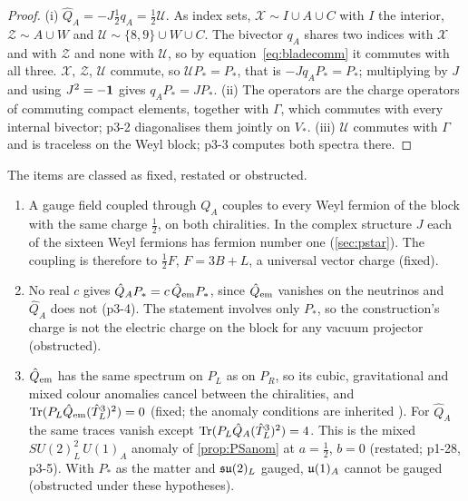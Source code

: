\begin{proof}
(i) $\hat Q_A=-J\tfrac12q_A=\tfrac12\mathcal U$. As index sets, $\mathcal X\sim I\cup A\cup C$ with $I$ the interior, $\mathcal Z\sim A\cup W$ and $\mathcal U\sim\{8,9\}\cup W\cup C$. The bivector $q_A$ shares two
indices with $\mathcal X$ and with $\mathcal Z$ and none with $\mathcal U$, so by equation~\cref{eq:bladecomm} it commutes with all three. $\mathcal X$, $\mathcal Z$, $\mathcal U$ commute, so $\mathcal UP_*=P_*$, that is
$-Jq_AP_*=P_*$; multiplying by $J$ and using $J^2=-\mathbf 1$ gives $q_AP_*=JP_*$. (ii) The operators are the charge operators of commuting compact elements, together with
$\Gamma$, which commutes with every internal bivector; p3-2 diagonalises them jointly on $V_*$. (iii) $\mathcal U$ commutes with $\Gamma$ and is traceless on the Weyl block;
p3-3 computes both spectra there.
\end{proof}

\begin{corollary}
\label{p3:cor:notem}
The items are classed as fixed, restated or obstructed.
\begin{enumerate}[label=(\roman*),leftmargin=2.2em]
\item A gauge field coupled through $Q_A$ couples to every Weyl fermion of the block with the same charge $\tfrac12$, on both chiralities. In the complex structure
$J$ each of the sixteen Weyl fermions has fermion number one (\cref{sec:pstar}). The coupling is therefore to $\tfrac12F$, $F=3B+L$, a universal vector charge
(fixed).
\item No real $c$ gives $\hat Q_AP_*=c\,\hat Q_{\rm em}P_*$, since $\hat Q_{\rm em}$ vanishes on the neutrinos and $\hat Q_A$ does not (p3-4). The statement
involves only $P_*$, so the construction's charge is not the electric charge on the block for any vacuum projector (obstructed).
\item $\hat Q_{\rm em}$ has the same spectrum on $P_L$ as on $P_R$, so its cubic, gravitational and mixed colour anomalies cancel between the chiralities, and
$\operatorname{Tr}(P_L\hat Q_{\rm em}(\hat T^3_L)^2)=0$ (fixed; the anomaly conditions are inherited \cite{BouchiatIliopoulosMeyer72,GeorgiGlashow72}). For $\hat Q_A$ the same
traces vanish except $\operatorname{Tr}(P_L\hat Q_A(\hat T^3_L)^2)=4$. This is the mixed $SU(2)_L^2\,U(1)_A$ anomaly of \cref{prop:PSanom} at $a=\tfrac12$, $b=0$ (restated;
p1-28, p3-5). With $P_*$ as the matter and $\mathfrak{su}(2)_L$ gauged, $\mathfrak{u}(1)_A$ cannot be gauged (obstructed under these hypotheses).
\end{enumerate}
\end{corollary}

